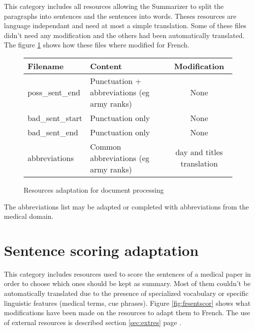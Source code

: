 \documentclass[a4paper,10pt]{article}
\begin{document}
This category includes all resources allowing the Summarizer to split
the paragraphs into sentences and the sentences into words. Theses
resources are language independant and need at most a simple
translation. Some of these files didn't need any modification and the
others had been automatically translated. The figure
\ref{fig:frdocproc} shows how these files where modified for French.

\begin{figure}[H]
  \centering
  \begin{tabular}[h]{|l|l|c|}
    \hline
    Filename & Content & Modification\\
    \hline
    poss\_sent\_end & Punctuation + abbreviations (eg army ranks) &
    None\\
    bad\_sent\_start & Punctuation only & None\\
    bad\_sent\_end & Punctuation only & None\\
    abbreviations & Common abbreviations (eg army ranks) & day and
    titles translation\\
    \hline
  \end{tabular}
  \caption{Resources adaptation for document processing}
  \label{fig:frdocproc}
\end{figure}

The abbreviations list may be adapted or completed with abbreviations
from the medical domain.



\section{Sentence scoring adaptation}
\label{sec:sentscor}

This category includes resources used to score the sentences of a
medical paper in order to choose which ones should be kept as
summary. Most of them couldn't be automatically translated due to the
presence of specialized vocabulary or specific linguistic features
(medical terms, cue phrases). Figure \ref{fig:frsentscor} shows what
modifications have been made on the resources to adapt them to
French. The use of external resources is described section
\ref{sec:extres} page \pageref{sec:extres}.
\end{document}
